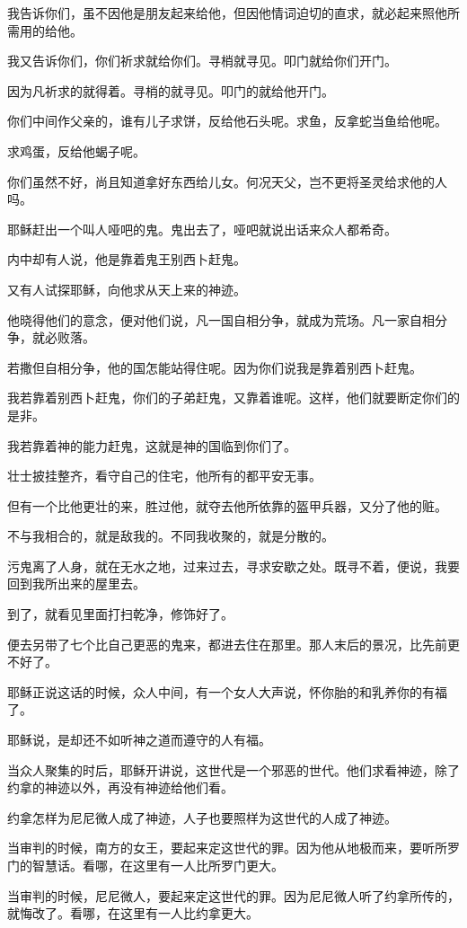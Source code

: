 \documentclass[12pt,oneside]{book}
\begin{document}
我告诉你们，虽不因他是朋友起来给他，但因他情词迫切的直求，就必起来照他所需用的给他。

我又告诉你们，你们祈求就给你们。寻梢就寻见。叩门就给你们开门。

因为凡祈求的就得着。寻梢的就寻见。叩门的就给他开门。

你们中间作父亲的，谁有儿子求饼，反给他石头呢。求鱼，反拿蛇当鱼给他呢。

求鸡蛋，反给他蝎子呢。

你们虽然不好，尚且知道拿好东西给儿女。何况天父，岂不更将圣灵给求他的人吗。

耶稣赶出一个叫人哑吧的鬼。鬼出去了，哑吧就说出话来众人都希奇。

内中却有人说，他是靠着鬼王别西卜赶鬼。

又有人试探耶稣，向他求从天上来的神迹。

他晓得他们的意念，便对他们说，凡一国自相分争，就成为荒场。凡一家自相分争，就必败落。

若撒但自相分争，他的国怎能站得住呢。因为你们说我是靠着别西卜赶鬼。

我若靠着别西卜赶鬼，你们的子弟赶鬼，又靠着谁呢。这样，他们就要断定你们的是非。

我若靠着神的能力赶鬼，这就是神的国临到你们了。

壮士披挂整齐，看守自己的住宅，他所有的都平安无事。

但有一个比他更壮的来，胜过他，就夺去他所依靠的盔甲兵器，又分了他的赃。

不与我相合的，就是敌我的。不同我收聚的，就是分散的。

污鬼离了人身，就在无水之地，过来过去，寻求安歇之处。既寻不着，便说，我要回到我所出来的屋里去。

到了，就看见里面打扫乾净，修饰好了。

便去另带了七个比自己更恶的鬼来，都进去住在那里。那人末后的景况，比先前更不好了。

耶稣正说这话的时候，众人中间，有一个女人大声说，怀你胎的和乳养你的有福了。

耶稣说，是却还不如听神之道而遵守的人有福。

当众人聚集的时后，耶稣开讲说，这世代是一个邪恶的世代。他们求看神迹，除了约拿的神迹以外，再没有神迹给他们看。

约拿怎样为尼尼微人成了神迹，人子也要照样为这世代的人成了神迹。

当审判的时候，南方的女王，要起来定这世代的罪。因为他从地极而来，要听所罗门的智慧话。看哪，在这里有一人比所罗门更大。

当审判的时候，尼尼微人，要起来定这世代的罪。因为尼尼微人听了约拿所传的，就悔改了。看哪，在这里有一人比约拿更大。
\end{document}
